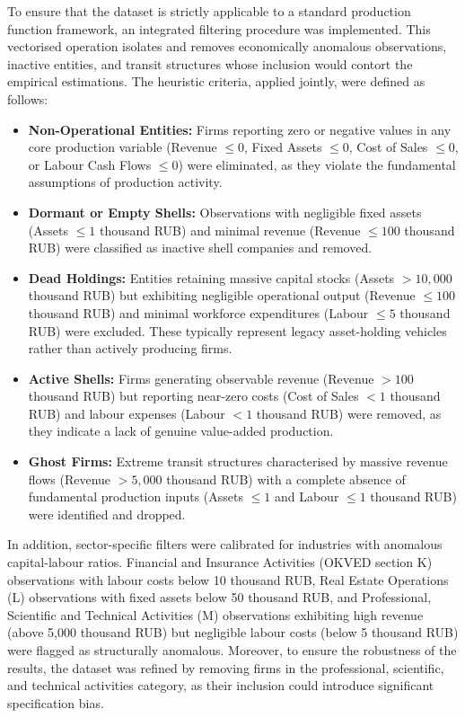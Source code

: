 \documentclass[a4paper, 12pt]{article}
\begin{document}
To ensure that the dataset is strictly applicable to a standard production function framework, an integrated filtering procedure was implemented. This vectorised operation isolates and removes economically anomalous observations, inactive entities, and transit structures whose inclusion would contort the empirical estimations. The heuristic criteria, applied jointly, were defined as follows:

\begin{itemize}
    \item \textbf{Non-Operational Entities:} Firms reporting zero or negative values in any core production variable (Revenue $\le 0$, Fixed Assets $\le 0$, Cost of Sales $\le 0$, or Labour Cash Flows $\le 0$) were eliminated, as they violate the fundamental assumptions of production activity.
    \item \textbf{Dormant or Empty Shells:} Observations with negligible fixed assets (Assets $\le 1$ thousand RUB) and minimal revenue (Revenue $\le 100$ thousand RUB) were classified as inactive shell companies and removed.
    \item \textbf{Dead Holdings:} Entities retaining massive capital stocks (Assets $> 10{,}000$ thousand RUB) but exhibiting negligible operational output (Revenue $\le 100$ thousand RUB) and minimal workforce expenditures (Labour $\le 5$ thousand RUB) were excluded. These typically represent legacy asset-holding vehicles rather than actively producing firms.
    \item \textbf{Active Shells:} Firms generating observable revenue (Revenue $> 100$ thousand RUB) but reporting near-zero costs (Cost of Sales $< 1$ thousand RUB) and labour expenses (Labour $< 1$ thousand RUB) were removed, as they indicate a lack of genuine value-added production.
    \item \textbf{Ghost Firms:} Extreme transit structures characterised by massive revenue flows (Revenue $> 5{,}000$ thousand RUB) with a complete absence of fundamental production inputs (Assets $\le 1$ and Labour $\le 1$ thousand RUB) were identified and dropped.
\end{itemize}

In addition, sector-specific filters were calibrated for industries with anomalous capital-labour ratios. Financial and Insurance Activities (OKVED section K) observations with labour costs below 10 thousand RUB, Real Estate Operations (L) observations with fixed assets below 50 thousand RUB, and Professional, Scientific and Technical Activities (M) observations exhibiting high revenue (above 5,000 thousand RUB) but negligible labour costs (below 5 thousand RUB) were flagged as structurally anomalous. Moreover, to ensure the robustness of the results, the dataset was refined by removing firms in the professional, scientific, and technical activities category, as their inclusion could introduce significant specification bias.
\end{document}
